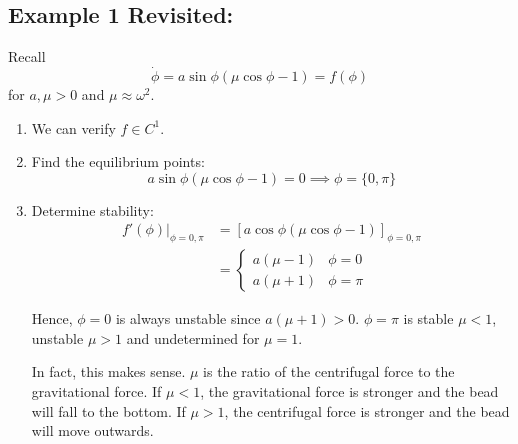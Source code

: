 \documentclass[12pt]{article}
\begin{document}
\subsection*{Example 1 Revisited:} Recall
\[\dot \phi = a \sin \phi(\mu \cos \phi - 1) = f(\phi)\]
for $a, \mu > 0$ and $\mu \approx \omega^2$.

\begin{enumerate}
    \item We can verify $f \in C^1$.

    \item Find the equilibrium points:
          \[a \sin \phi (\mu \cos \phi - 1) = 0 \implies \phi = \{0, \pi\}\]

    \item Determine stability:
          \begin{align*}
              f'(\phi) \bigg\vert_{\phi = 0, \pi} & = \left[a \cos \phi (\mu \cos \phi - 1)\right]_{\phi = 0, \pi} \\
                                                  & = \begin{cases}
                                                          a(\mu - 1) & \phi = 0   \\
                                                          a(\mu + 1) & \phi = \pi
                                                      \end{cases}
          \end{align*}

          Hence, $\phi = 0$ is always unstable since $a(\mu + 1) > 0$. $\phi = \pi$ is stable $\mu < 1$, unstable $\mu > 1$ and undetermined for $\mu = 1$.

          In fact, this makes sense. $\mu$ is the ratio of the centrifugal force to the gravitational force. If $\mu < 1$, the gravitational force is stronger and the bead will fall to the bottom. If $\mu > 1$, the centrifugal force is stronger and the bead will move outwards.

\end{enumerate}
\end{document}
